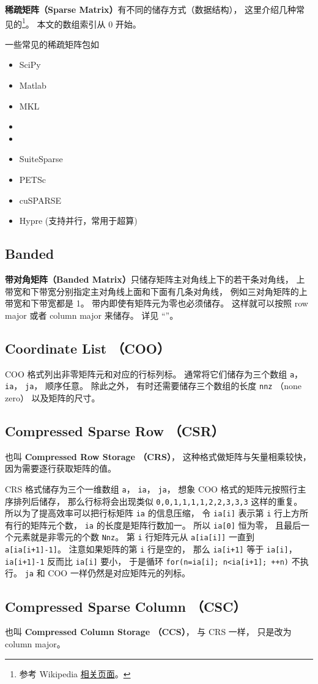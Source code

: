 
\textbf{稀疏矩阵（Sparse Matrix）}有不同的储存方式（数据结构）， 这里介绍几种常见的\footnote{参考 Wikipedia \href{https://en.wikipedia.org/wiki/Sparse_matrix}{相关页面}。}。 本文的数组索引从 0 开始。

一些常见的稀疏矩阵包如
\begin{itemize}
\item SciPy
\item Matlab
\item MKL
\item  {}
\item  {}
\item SuiteSparse
\item PETSc
\item cuSPARSE
\item Hypre (支持并行，常用于超算)




\end{itemize}


\subsection{Banded}
\textbf{带对角矩阵（Banded Matrix）}只储存矩阵主对角线上下的若干条对角线， 上带宽和下带宽分别指定主对角线上面和下面有几条对角线， 例如三对角矩阵的上带宽和下带宽都是 1。 带内即使有矩阵元为零也必须储存。 这样就可以按照 row major 或者 column major 来储存。 详见 “”。

\subsection{Coordinate List （COO）}
COO 格式列出非零矩阵元和对应的行标列标。 通常将它们储存为三个数组 \verb|a|， \verb|ia|， \verb|ja|， 顺序任意。 除此之外， 有时还需要储存三个数组的长度 \verb|nnz| （none zero） 以及矩阵的尺寸。

\subsection{Compressed Sparse Row （CSR）}\label{sub_SprMat_3}
也叫 \textbf{Compressed Row Storage （CRS）}， 这种格式做矩阵与矢量相乘较快，因为需要逐行获取矩阵的值。

CRS 格式储存为三个一维数组 \verb|a|， \verb|ia|， \verb|ja|， 想象 COO 格式的矩阵元按照行主序排列后储存， 那么行标将会出现类似 \verb|0,0,1,1,1,1,2,2,3,3,3| 这样的重复。 所以为了提高效率可以把行标矩阵 \verb|ia| 的信息压缩， 令 \verb|ia[i]| 表示第 \verb|i| 行上方所有行的矩阵元个数， \verb|ia| 的长度是矩阵行数加一。 所以 \verb|ia[0]| 恒为零， 且最后一个元素就是非零元的个数 \verb|Nnz|。 第 \verb|i| 行矩阵元从 \verb|a[ia[i]]| 一直到 \verb|a[ia[i+1]-1]|。 注意如果矩阵的第 \verb|i| 行是空的， 那么 \verb|ia[i+1]| 等于 \verb|ia[i]|， \verb|ia[i+1]-1| 反而比 \verb|ia[i]| 要小， 于是循环 \verb|for(n=ia[i]; n<ia[i+1]; ++n)| 不执行。 \verb|ja| 和 COO 一样仍然是对应矩阵元的列标。

\subsection{Compressed Sparse Column （CSC）}
也叫 \textbf{Compressed Column Storage （CCS）}， 与 CRS 一样， 只是改为 column major。
